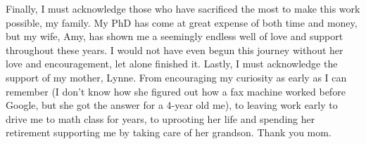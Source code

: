 Finally, I must acknowledge those who have sacrificed the most to make this work possible, my family. My PhD has come at great expense of both time and money, but my wife, Amy, has shown me a seemingly endless well of love and support throughout these years. I would not have even begun this journey without her love and encouragement, let alone finished it. Lastly, I must acknowledge the support of my mother, Lynne. From encouraging my curiosity as early as I can remember (I don't know how she figured out how a fax machine worked before Google, but she got the answer for a 4-year old me), to leaving work early to drive me to math class for years, to uprooting her life and spending her retirement supporting me by taking care of her grandson. Thank you mom.

